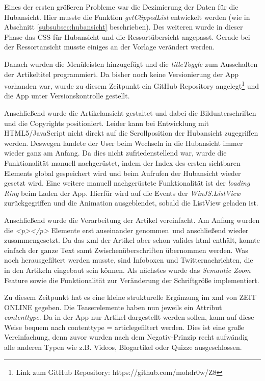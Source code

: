 \documentclass[12pt,a4paper,bibtotoc,abstracton]{scrartcl}
\begin{document}
Eines der ersten größeren Probleme war die Dezimierung der Daten für die Hubansicht. Hier musste die Funktion \textit{getClippedList} entwickelt werden (wie in Abschnitt \ref{subsubsec:hubansicht} beschrieben). Des weiteren wurde in dieser Phase das CSS für Hubansicht und die Ressortübersicht angepasst. Gerade bei der Ressortansicht musste einiges an der Vorlage verändert werden.

Danach wurden die Menüleisten hinzugefügt  und die \textit{titleToggle} zum Ausschalten der Artikeltitel programmiert. Da bisher noch keine Versionierung der App vorhanden war, wurde zu diesem Zeitpunkt ein GitHub Repository angelegt\footnote{Link zum GitHub Repository: https://github.com/mohdr0w/Z8} und die App unter Versionskontrolle gestellt. 

Anschließend wurde die Artikelansicht gestaltet und dabei die Bildunterschriften und die Copyrights positioniert. Leider kann bei Entwicklung mit HTML5/JavaScript nicht direkt auf die Scrollposition der Hubansicht zugegriffen werden. Deswegen landete der User beim Wechseln in die Hubansicht immer wieder ganz am Anfang. Da dies nicht zufriedenstellend war, wurde die Funktionalität manuell nachgerüstet, indem der Index des ersten sichtbaren Elements global gespeichert wird und beim Aufrufen der Hubansicht wieder gesetzt wird. Eine weitere manuell nachgerüstete Funktionalität ist der \textit{loading Ring} beim Laden der App. Hierfür wird auf die Events der \textit{WinJS.ListView} zurückgegriffen und die Animation ausgeblendet, sobald die ListView geladen ist.

Anschließend wurde die Verarbeitung der Artikel vereinfacht. Am Anfang wurden die \textit{<p></p>} Elemente erst \glqq auseinander genommen\grqq\ und anschließend wieder zusammengesetzt. Da das \ac{xml} der Artikel aber schon valides \ac{html} enthält, konnte einfach der ganze Text samt Zwischenüberschriften übernommen werden. Was noch herausgefiltert werden musste, sind Infoboxen und Twitternachrichten, die in den Artikeln eingebaut sein können. Als nächstes wurde das \textit{Semantic Zoom} Feature sowie die Funktionalität zur Veränderung der Schriftgröße implementiert.   

Zu diesem Zeitpunkt hat es eine kleine strukturelle Ergänzung im \ac{xml} von ZEIT ONLINE gegeben. Die Teaserelemente haben nun jeweils ein Attribut \textit{contenttype}. Da in der App nur Artikel dargestellt werden sollen, kann auf diese Weise bequem nach \glqq contenttype = article\grqq gefiltert werden. Dies ist eine große Vereinfachung, denn zuvor wurden nach dem Negativ-Prinzip recht aufwändig alle anderen Typen wie z.B. Videos, Blogartikel oder Quizze ausgeschlossen.  
\end{document}
